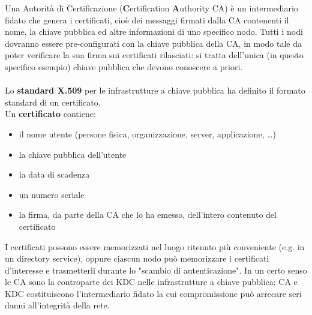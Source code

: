 Una Autorità di Certificazione (\textbf{C}ertification \textbf{A}uthority CA) è un intermediario fidato che genera i certificati, cioè dei messaggi firmati dalla CA contenenti il nome, la chiave pubblica ed altre informazioni di uno specifico nodo. Tutti i nodi dovranno essere pre-configurati con la chiave pubblica della CA, in modo tale da poter verificare la sua firma sui certificati rilasciati: si tratta dell'unica (in questo specifico esempio) chiave pubblica che devono conoscere a priori. \\ \\
Lo \textbf{standard X.509} per le infrastrutture a chiave pubblica ha definito il formato standard di un certificato. \\
Un \textbf{certificato} contiene:
\begin{itemize}
	\item il nome utente (persone fisica, organizzazione, server, applicazione, …)
	\item la chiave pubblica dell'utente
	\item la data di scadenza
	\item un numero seriale
	\item la firma, da parte della CA che lo ha emesso, dell'intero contenuto del certificato
\end{itemize}
I certificati possono essere memorizzati nel luogo ritenuto più conveniente (e.g. in un directory service), oppure
ciascun nodo può memorizzare i certificati d'interesse e trasmetterli durante lo "scambio di autenticazione". 
In un certo senso le CA sono la controparte dei KDC nelle infrastrutture a chiave pubblica: CA e KDC costituiscono l'intermediario fidato la cui compromissione può arrecare seri danni all'integrità della rete. 


